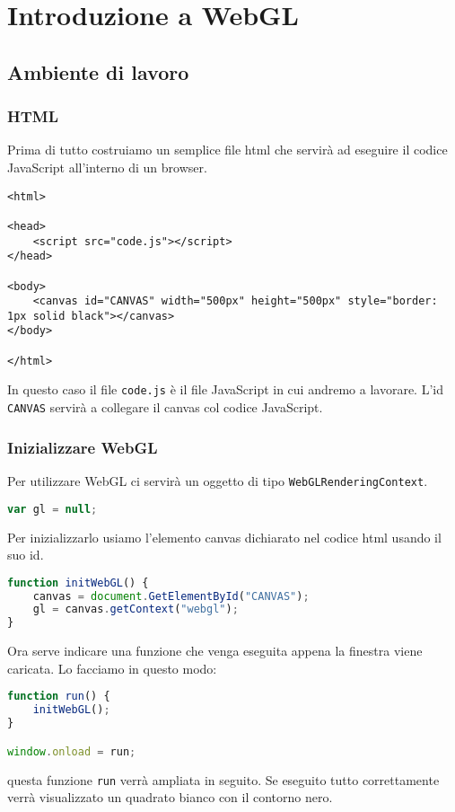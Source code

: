 
\chapter{Introduzione a WebGL}
\section{Ambiente di lavoro}
\subsection{HTML}
Prima di tutto costruiamo un semplice file html che servir\`a ad eseguire il codice JavaScript
all'interno di un browser.
\begin{lstlisting}[language=html5]
<html>

<head>
	<script src="code.js"></script>
</head>

<body>
	<canvas id="CANVAS" width="500px" height="500px" style="border: 1px solid black"></canvas>
</body>

</html>
\end{lstlisting}
In questo caso il file \verb|code.js| \`e il file JavaScript in cui andremo a lavorare.
L'id \verb|CANVAS| servir\`a a collegare il canvas col codice JavaScript.

\subsection{Inizializzare WebGL}
Per utilizzare WebGL ci servir\`a un oggetto di tipo \verb|WebGLRenderingContext|.
\begin{lstlisting}[language=javascript]
var gl = null;
\end{lstlisting}
Per inizializzarlo usiamo l'elemento canvas dichiarato nel codice html usando il suo id.
\begin{lstlisting}[language=javascript, firstnumber=2]
function initWebGL() {
	canvas = document.GetElementById("CANVAS");
	gl = canvas.getContext("webgl");
}
\end{lstlisting}
Ora serve indicare una funzione che venga eseguita appena la finestra viene caricata. Lo
facciamo in questo modo:
\begin{lstlisting}[language=javascript, firstnumber=6]
function run() {
	initWebGL();
}

window.onload = run;
\end{lstlisting}
questa funzione \verb|run| verr\`a ampliata in seguito.
Se eseguito tutto correttamente verr\`a visualizzato un quadrato bianco con il contorno nero.

